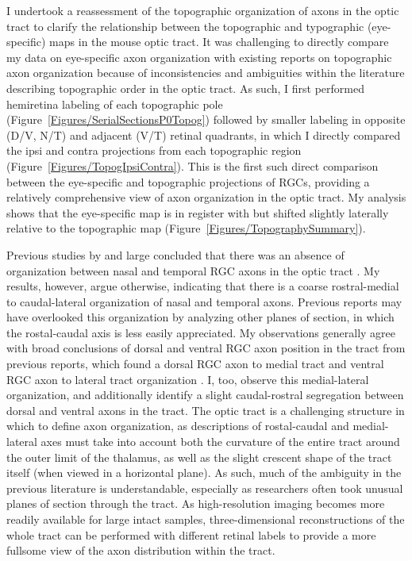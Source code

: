\label{sec:TopogDiscuss}
I undertook a reassessment of the topographic organization of axons in the optic tract to clarify the relationship between the topographic and typographic (eye-specific) maps in the mouse optic tract.
It was challenging to directly compare my data on eye-specific axon organization with existing reports on topographic axon organization because of inconsistencies and ambiguities within the literature describing topographic order in the optic tract.
As such, I first performed hemiretina labeling of each topographic pole (Figure~\ref{Figures/SerialSectionsP0Topog}) followed by smaller labeling in opposite (D/V, N/T) and adjacent (V/T) retinal quadrants, in which I directly compared the ipsi and contra projections from each topographic region (Figure~\ref{Figures/TopogIpsiContra}).
This is the first such direct comparison between the eye-specific and topographic projections of RGCs, providing a relatively comprehensive view of axon organization in the optic tract.
My analysis shows that the eye-specific map is in register with but shifted slightly laterally relative to the topographic map (Figure~\ref{Figures/TopographySummary}).

Previous studies by and large concluded that there was an absence of organization between nasal and temporal RGC axons in the optic tract \cite{chan1994changes,plas2005pretarget,reese1993reestablishment}.
My results, however, argue otherwise, indicating that there is a coarse rostral-medial to caudal-lateral organization of nasal and temporal axons.
Previous reports may have overlooked this organization by analyzing other planes of section, in which the rostal-caudal axis is less easily appreciated.
My observations generally agree with broad conclusions of dorsal and ventral RGC axon position in the tract from previous reports, which found a dorsal RGC axon to medial tract and ventral RGC axon to lateral tract organization \cite{chan1999changes,chan1994changes,plas2005pretarget,reese1993reestablishment,reese1990fibre,reh1983organization,torrealba1982studies}.%
I, too, observe this medial-lateral organization, and additionally identify a slight caudal-rostral segregation between dorsal and ventral axons in the tract.
The optic tract is a challenging structure in which to define axon organization, as descriptions of rostal-caudal and medial-lateral axes must take into account both the curvature of the entire tract around the outer limit of the thalamus, as well as the slight crescent shape of the tract itself (when viewed in a horizontal plane).
As such, much of the ambiguity in the previous literature is understandable, especially as researchers often took unusual planes of section through the tract.
As high-resolution imaging becomes more readily available for large intact samples, three-dimensional reconstructions of the whole tract can be performed with different retinal labels to provide a more fullsome view of the axon distribution within the tract.

